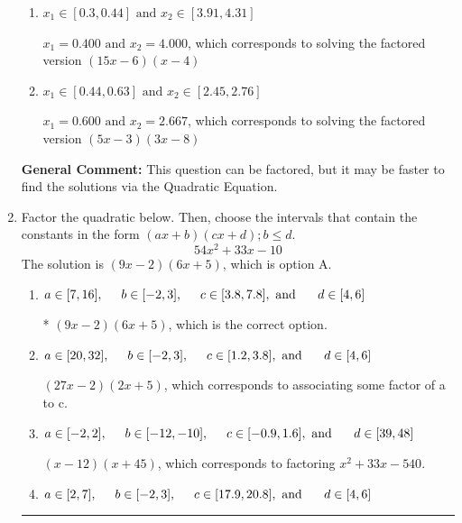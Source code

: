 \documentclass{extbook}[14pt]
\newcommand{\litem}[1]{\item #1

\rule{\textwidth}{0.4pt}}
\begin{document}
\begin{enumerate}
{\begin{enumerate}[label=\Alph*.]
* $x_1 = 1.200 \text{ and } x_2 = 1.333$, which is the correct option. Obtained by solving the factored version $(5x -6)(3x -4)$
\item \( x_1 \in [0.3, 0.44] \text{ and } x_2 \in [3.91, 4.31] \)

$x_1 = 0.400 \text{ and } x_2 = 4.000$, which corresponds to solving the factored version $(15x -6)(x -4)$
\item \( x_1 \in [0.44, 0.63] \text{ and } x_2 \in [2.45, 2.76] \)

$x_1 = 0.600 \text{ and } x_2 = 2.667$, which corresponds to solving the factored version $(5x -3)(3x -8)$
\end{enumerate}

\textbf{General Comment:} This question can be factored, but it may be faster to find the solutions via the Quadratic Equation.
}
\litem{
Factor the quadratic below. Then, choose the intervals that contain the constants in the form $(ax+b)(cx+d); b \leq d.$
\[ 54x^{2} +33 x -10 \]The solution is \( (9x -2)(6x + 5) \), which is option A.\begin{enumerate}[label=\Alph*.]
\item \( a \in [7, 16], \hspace*{5mm} b \in [-2, 3], \hspace*{5mm} c \in [3.8, 7.8], \text{ and } \hspace*{5mm} d \in [4, 6] \)

* $(9x -2)(6x + 5)$, which is the correct option.
\item \( a \in [20, 32], \hspace*{5mm} b \in [-2, 3], \hspace*{5mm} c \in [1.2, 3.8], \text{ and } \hspace*{5mm} d \in [4, 6] \)

 $(27x -2)(2x + 5)$, which corresponds to associating some factor of a to c.
\item \( a \in [-2, 2], \hspace*{5mm} b \in [-12, -10], \hspace*{5mm} c \in [-0.9, 1.6], \text{ and } \hspace*{5mm} d \in [39, 48] \)

 $(x -12)(x + 45)$, which corresponds to factoring $x^{2} +33 x -540$.
\item \( a \in [2, 7], \hspace*{5mm} b \in [-2, 3], \hspace*{5mm} c \in [17.9, 20.8], \text{ and } \hspace*{5mm} d \in [4, 6] \)


\end{enumerate}}
\end{enumerate}
\end{document}
